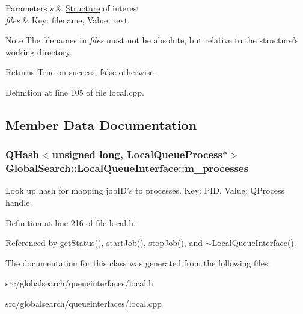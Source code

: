 \begin{DoxyParams}{Parameters}
{\em s} & \hyperlink{classGlobalSearch_1_1Structure}{Structure} of interest \\
\hline
{\em files} & Key\-: filename, Value\-: text.\\
\hline
\end{DoxyParams}
\begin{DoxyNote}{Note}
The filenames in {\itshape files} must not be absolute, but relative to the structure's working directory.
\end{DoxyNote}
\begin{DoxyReturn}{Returns}
True on success, false otherwise. 
\end{DoxyReturn}


Definition at line 105 of file local.\-cpp.



\subsection{Member Data Documentation}
\hypertarget{classGlobalSearch_1_1LocalQueueInterface_a7a7326a16048896fd7c88d17e3973cda}{
\subsubsection[{m\-\_\-processes}]{\setlength{\rightskip}{0pt plus 5cm}Q\-Hash$<$unsigned long, Local\-Queue\-Process$\ast$$>$ Global\-Search\-::\-Local\-Queue\-Interface\-::m\-\_\-processes\hspace{0.3cm}{\ttfamily [protected]}}}\label{classGlobalSearch_1_1LocalQueueInterface_a7a7326a16048896fd7c88d17e3973cda}
Look up hash for mapping job\-I\-D's to processes. Key\-: P\-I\-D, Value\-: Q\-Process handle 

Definition at line 216 of file local.\-h.



Referenced by get\-Status(), start\-Job(), stop\-Job(), and $\sim$\-Local\-Queue\-Interface().



The documentation for this class was generated from the following files\-:\begin{DoxyCompactItemize}
\item 
src/globalsearch/queueinterfaces/local.\-h\item 
src/globalsearch/queueinterfaces/local.\-cpp\end{DoxyCompactItemize}
